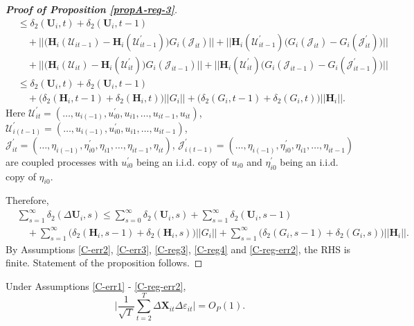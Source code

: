 \begin{proof}[\textnormal{\textbf{Proof of Proposition \ref{propA-reg-3}}}]
\begin{align*}
  &\leq \delta_2(\mathbf{U}_i, t) + \delta_2(\mathbf{U}_i, t-1)   \\
  &\quad +||\big(\mathbf{H}_i(\mathcal{U}_{it-1}) - \mathbf{H}_i(\mathcal{U}_{it-1}^\prime)\big) G_i(\mathcal{J}_{it})|| +  ||\mathbf{H}_i(\mathcal{U}_{it-1}^\prime)\big(G_i(\mathcal{J}_{it}) - G_i(\mathcal{J}_{it}^\prime)\big)    ||\\
 &\quad + ||\big(\mathbf{H}_i(\mathcal{U}_{it}) -\mathbf{H}_i(\mathcal{U}_{it}^\prime)\big)G_i(\mathcal{J}_{it-1})|| + ||\mathbf{H}_i(\mathcal{U}_{it}^\prime)\big(G_i(\mathcal{J}_{it-1}) -G_i(\mathcal{J}_{it-1}^\prime)\big) ||  \\
 &\leq \delta_2(\mathbf{U}_i, t) + \delta_2(\mathbf{U}_i, t-1)  \\
&\quad + \big(\delta_2(\mathbf{H}_i, t-1) +  \delta_2(\mathbf{H}_i, t)\big) ||G_i || + \big( \delta_2(G_i, t-1) +  \delta_2(G_i, t)\big)||\mathbf{H}_i ||.
\end{align*}
Here $\mathcal{U}_{it}^\prime  = (\ldots, u_{i(-1)}, u^\prime_{i0}, u_{i1}, \ldots, u_{it-1}, u_{it})$, $\mathcal{U}_{i(t-1)}^\prime  = (\ldots, u_{i(-1)}, u^\prime_{i0}, u_{i1}, \ldots, u_{it-1})$, $\mathcal{J}_{it}^\prime  = (\ldots, \eta_{i(-1)}, \eta^\prime_{i0}, \eta_{i1}, \ldots, \eta_{it-1}, \eta_{it})$, $\mathcal{J}_{i(t-1)}^\prime  = (\ldots, \eta_{i(-1)}, \eta^\prime_{i0}, \eta_{i1}, \ldots, \eta_{it-1})$ are coupled processes with $u_{i0}^\prime$ being an i.i.d. copy of $u_{i0}$ and $\eta_{i0}^\prime$ being an i.i.d. copy of $\eta_{i0}$.

\vspace{2mm}
Therefore,
\begin{align*}
 &\sum_{s=1}^\infty \delta_2(\Delta \mathbf{U}_i, s) \leq \sum_{s=0}^\infty \delta_2(\mathbf{U}_i, s) + \sum_{s=1}^\infty\delta_2(\mathbf{U}_i, s-1)  \\
 &\quad + \sum_{s=1}^\infty\big(\delta_2(\mathbf{H}_i, s-1) +  \delta_2(\mathbf{H}_i, s)\big) ||G_i || + \sum_{s=1}^\infty\big( \delta_2(G_i, s-1) +  \delta_2(G_i, s)\big)||\mathbf{H}_i ||.
\end{align*}
By Assumptions \ref{C-err2}, \ref{C-err3}, \ref{C-reg3}, \ref{C-reg4} and \ref{C-reg-err2}, the RHS is finite. Statement of the proposition follows. 
\end{proof}


\begin{propA}\label{propA:beta4}
Under Assumptions \ref{C-err1} - \ref{C-reg-err2},
\[ \Big| \frac{1}{\sqrt{T}}\sum_{t=2}^T \Delta \mathbf{X}_{it}\Delta \varepsilon_{it} \Big| = O_P(1).
\]
\end{propA}

